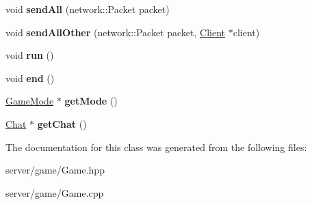\begin{DoxyCompactItemize}
\item 
\hypertarget{class_game_ad9e309b54a0c57032177efbb1175fc82}{void {\bfseries send\-All} (network\-::\-Packet packet)}\label{class_game_ad9e309b54a0c57032177efbb1175fc82}

\item 
\hypertarget{class_game_ac13e6bec65c5de67728a1e1528bbac91}{void {\bfseries send\-All\-Other} (network\-::\-Packet packet, \hyperlink{class_client}{Client} $\ast$client)}\label{class_game_ac13e6bec65c5de67728a1e1528bbac91}

\item 
\hypertarget{class_game_a1ab78f5ed0d5ea879157357cf2fb2afa}{void {\bfseries run} ()}\label{class_game_a1ab78f5ed0d5ea879157357cf2fb2afa}

\item 
\hypertarget{class_game_aa2d938aa918268060e63980c7efd86f8}{void {\bfseries end} ()}\label{class_game_aa2d938aa918268060e63980c7efd86f8}

\item 
\hypertarget{class_game_a73e51fdad57e438271523efa6138bb0a}{\hyperlink{class_game_mode}{Game\-Mode} $\ast$ {\bfseries get\-Mode} ()}\label{class_game_a73e51fdad57e438271523efa6138bb0a}

\item 
\hypertarget{class_game_addb65c784e4f79943f1b810a4630c087}{\hyperlink{class_chat}{Chat} $\ast$ {\bfseries get\-Chat} ()}\label{class_game_addb65c784e4f79943f1b810a4630c087}

\end{DoxyCompactItemize}


The documentation for this class was generated from the following files\-:\begin{DoxyCompactItemize}
\item 
server/game/Game.\-hpp\item 
server/game/Game.\-cpp\end{DoxyCompactItemize}
